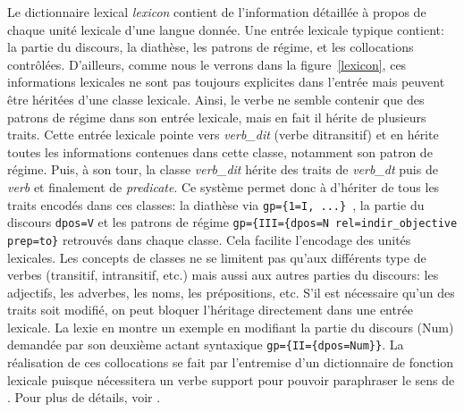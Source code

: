 Le dictionnaire lexical \emph{lexicon} contient de l'information détaillée à propos de chaque unité lexicale d'une langue donnée. Une entrée lexicale typique contient: la partie du discours, la diathèse, les patrons de régime, et les collocations contrôlées. D'ailleurs, comme nous le verrons dans la figure~\ref{lexicon}, ces informations lexicales ne sont pas toujours explicites dans l'entrée mais peuvent être héritées d'une classe lexicale. Ainsi, le verbe  ne semble contenir que des patrons de régime dans son entrée lexicale, mais en fait il hérite de plusieurs traits. Cette entrée lexicale pointe vers \emph{verb\_dit} (verbe ditransitif) et en hérite toutes les informations contenues dans cette classe, notamment son patron de régime. Puis, à son tour, la classe \emph{verb\_dit} hérite des traits de \emph{verb\_dt} puis de \emph{verb} et finalement de \emph{predicate}. Ce système permet donc à  d'hériter de tous les traits encodés dans ces classes: la diathèse via \lstinline!gp={1=I, ...} !, la partie du discours \lstinline{dpos=V} et les patrons de régime \lstinline!gp={III={dpos=N rel=indir_objective prep=to}! retrouvés dans chaque classe. Cela facilite l'encodage des unités lexicales. Les concepts de classes ne se limitent pas qu'aux différents type de verbes (transitif, intransitif, etc.) mais aussi aux autres parties du discours: les adjectifs, les adverbes, les noms, les prépositions, etc. S'il est nécessaire qu'un des traits soit modifié, on peut bloquer l'héritage directement dans une entrée lexicale. La lexie  en montre un exemple en modifiant la partie du discours (Num) demandée par son deuxième actant syntaxique \lstinline!gp={II={dpos=Num}}!.  La réalisation de ces collocations se fait par l'entremise d'un dictionnaire de fonction lexicale puisque  nécessitera un verbe support pour pouvoir paraphraser le sens de . Pour plus de détails, voir \cite{lambrey15,LambreyImplementationcollocationspour2017}.

